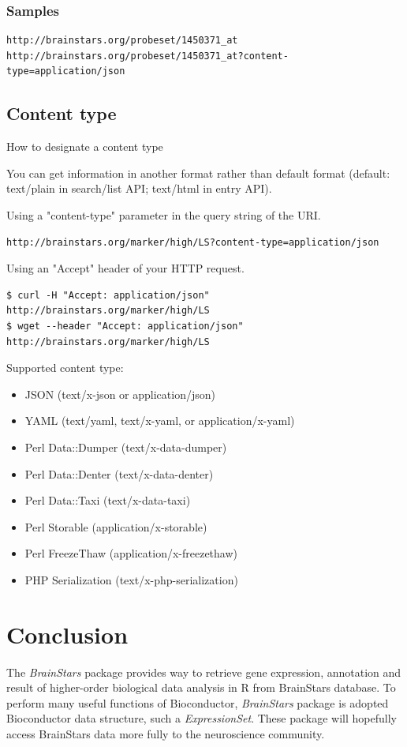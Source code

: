 \documentclass[12pt,fullpage]{article}
\newcommand{\Rpackage}[1]{{\textit{#1}}}
\newcommand{\Rclass}[1]{{\textit{#1}}}
\begin{document}
\subsubsection{Samples}
\begin{verbatim}
http://brainstars.org/probeset/1450371_at
http://brainstars.org/probeset/1450371_at?content-type=application/json
\end{verbatim}

\subsection{Content type}
How to designate a content type

You can get information in another format rather than default format (default: text/plain in search/list API; text/html in entry API).

Using a "content-type" parameter in the query string of the URI. 
\begin{verbatim}
http://brainstars.org/marker/high/LS?content-type=application/json
\end{verbatim}

Using an "Accept" header of your HTTP request. 
\begin{verbatim}
$ curl -H "Accept: application/json" http://brainstars.org/marker/high/LS 
$ wget --header "Accept: application/json" http://brainstars.org/marker/high/LS
\end{verbatim}

Supported content type:
\begin{itemize}
  \item JSON (text/x-json or application/json)
  \item YAML (text/yaml, text/x-yaml, or application/x-yaml)
  \item Perl Data::Dumper (text/x-data-dumper)
  \item Perl Data::Denter (text/x-data-denter)
  \item Perl Data::Taxi (text/x-data-taxi)
  \item Perl Storable (application/x-storable)
  \item Perl FreezeThaw (application/x-freezethaw)
  \item PHP Serialization (text/x-php-serialization)
\end{itemize}

\section{Conclusion}
The \Rpackage{BrainStars} package provides way to retrieve gene expression, 
annotation and result of higher-order biological data analysis in R from 
BrainStars database. To perform many useful functions of Bioconductor, 
\Rpackage{BrainStars} package is adopted Bioconductor data structure, 
such a \Rclass{ExpressionSet}. These package will hopefully access BrainStars 
data more fully to the neuroscience community.
\end{document}
